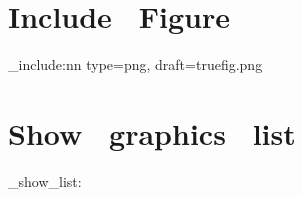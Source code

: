\documentclass{article}
\begin{document}
\section{Include~ Figure}
\graphics_include:nn {type=png, draft=true}{fig.png}


\section{Show~ graphics~ list}
\graphics_show_list:
\end{document}
